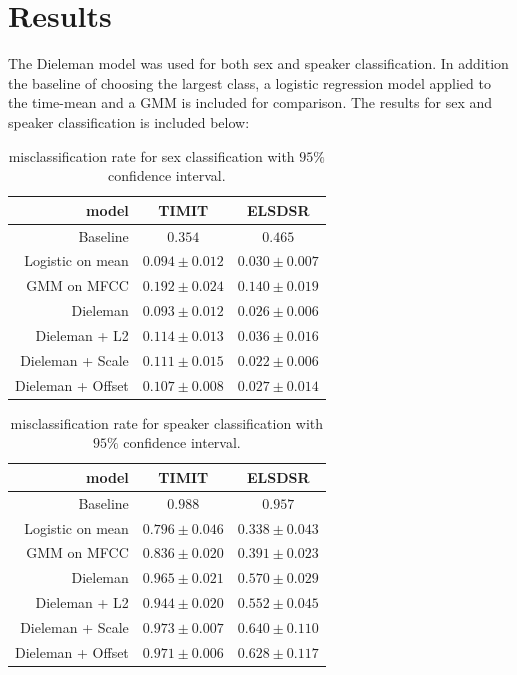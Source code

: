 \section{Results}

The Dieleman model was used for both sex and speaker classification. In addition the baseline of choosing the largest class, a logistic regression model applied to the time-mean and a GMM is included for comparison. The results for sex and speaker classification is included below:

\begin{table}[H]
\centering
\begin{tabular}{r|c|c}
model & TIMIT & ELSDSR \\ \hline
                    Baseline & $0.354$ & $0.465$ \\
                    Logistic on mean & $0.094 \pm 0.012$ & $0.030 \pm 0.007$ \\
                 GMM on MFCC & $0.192 \pm 0.024$ & $0.140 \pm 0.019$ \\
                    Dieleman & $0.093 \pm 0.012$ & $0.026 \pm 0.006$ \\
     Dieleman + L2 & $0.114 \pm 0.013$ & $0.036 \pm 0.016$ \\
  Dieleman + Scale & $0.111 \pm 0.015$ & $0.022 \pm 0.006$ \\
 Dieleman + Offset & $0.107 \pm 0.008$ & $0.027 \pm 0.014$ \\
\end{tabular}
\caption{misclassification rate for sex classification with $95\%$ confidence interval.}
\label{tab:results-sex}
\end{table}

\begin{table}[H]
\centering
\begin{tabular}{r|c|c}
model & TIMIT & ELSDSR \\ \hline
                    Baseline & $0.988$ & $0.957$ \\
                    Logistic on mean & $0.796 \pm 0.046$ & $0.338 \pm 0.043$ \\
                 GMM on MFCC & $0.836 \pm 0.020$ & $0.391 \pm 0.023$ \\
                    Dieleman & $0.965 \pm 0.021$ & $0.570 \pm 0.029$ \\
     Dieleman + L2 & $0.944 \pm 0.020$ & $0.552 \pm 0.045$ \\
  Dieleman + Scale & $0.973 \pm 0.007$ & $0.640 \pm 0.110$ \\
 Dieleman + Offset & $0.971 \pm 0.006$ & $0.628 \pm 0.117$ \\
\end{tabular}
\caption{misclassification rate for speaker classification with $95\%$ confidence interval.}
\label{tab:results-speaker}
\end{table}

